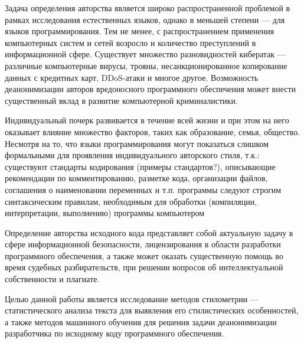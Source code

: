 Задача определения авторства является широко распространенной проблемой в рамках исследования естественных языков, однако в меньшей степени --- для языков программирования. 
Тем не менее, с распространением применения компьютерных систем и сетей возросло и количество преступлений в 
информационной сфере. Существует множество разновидностей кибератак --- различные компьютерные вирусы, 
трояны, несанкционированное копирование данных с кредитных карт, DDoS-атаки и многое другое. 
Возможность деанонимизации авторов вредоносного программного обеспечения может внести существенный вклад 
в развитие компьютерной криминалистики.

Индивидуальный почерк развивается в течение всей жизни и при этом на него оказывает влияние множество факторов, таких как образование, семья, общество. 
Несмотря на то, что языки программирования могут показаться слишком формальными для проявления индивидуального авторского стиля, т.к.:
существуют стандарты кодирования (примеры стандартов?), описывающие рекомендации по комментированию, разметке кода, организации файлов, соглашения о наименовании переменных и т.п.
программы следуют строгим синтаксическим правилам, необходимым для обработки (компиляции, интерпретации, выполнению) программы компьютером

Определение авторства исходного кода представляет собой актуальную задачу в сфере информационной 
безопасности, лицензирования в области разработки программного обеспечения, а также может оказать 
существенную помощь во время судебных разбирательств, при решении вопросов об интеллектуальной 
собственности и плагиате.

Целью данной работы является исследование методов стилометрии --- статистического анализа текста 
для выявления его стилистических особенностей, а также методов машинного обучения для решения задачи 
деанонимизации разработчика по исходному коду программного обеспечения.
